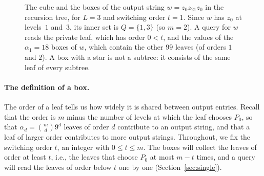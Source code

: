 \begin{figure}[t]
\caption{The cube and the boxes of the output string $w=z_0z_{21}z_0$ in the recursion tree, for $L=3$ and switching order $t=1$. Since $w$ has $z_0$ at levels~$1$ and~$3$, its inner set is $Q=\{1,3\}$ (so $m=2$). A query for $w$ reads the private leaf, which has order $0<t$, and the values of the $\alpha_1=18$ boxes of $w$, which contain the other $99$ leaves (of orders $1$ and $2$). A box with a star is not a subtree: it consists of the same leaf of every subtree.}
\label{fig:tree}
\end{figure}

\paragraph{The definition of a box.}
The order of a leaf tells us how widely it is shared between output entries. Recall that the order is $m$ minus the number of levels at which the leaf chooses $P_0$, so that $\alpha_d=\binom md9^d$ leaves of order $d$ contribute to an output string, and that a leaf of larger order contributes to more output strings. Throughout, we fix the switching order $t$, an integer with $0\le t\le m$. The boxes will collect the leaves of order at least $t$, i.e., the leaves that choose $P_0$ at most $m-t$ times, and a query will read the leaves of order below $t$ one by one (Section~\ref{sec:single}).

